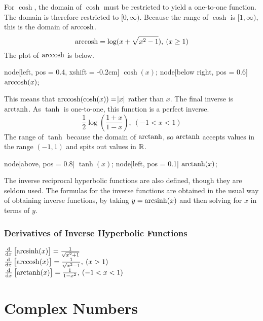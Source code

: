 \documentclass[12pt]{report}
\begin{document}
\begin{flushleft}
For \(\cosh\), the domain of \(\cosh\) must be restricted to yield a one-to-one
function. The domain is therefore restricted to \([0, \infty)\). Because the 
range of \(\cosh\) is \([1, \infty)\), this is the domain of \(\operatorname{arccosh}\).
\[\operatorname{arccosh} = \log(x + \sqrt{x^2 - 1}), \:(x \geq 1)\]
The plot of \(\operatorname{arccosh}\) is below.

\begin{plot}
    node[left, pos = 0.4, xshift = -0.2cm] {\(\cosh(x)\)};
    node[below right, pos = 0.6] {\(\operatorname{arccosh}(x)\)};
\end{plot}

This means that \(\operatorname{arccosh}(\cosh(x)) = \abs{x}\) rather than \(x\). The final
inverse is \(\operatorname{arctanh}\). As \(\tanh\) is one-to-one, this function is a perfect
inverse.
\[\frac{1}{2}\log\left(\frac{1 + x}{1 - x}\right), \:(-1 < x < 1)\]
The range of \(\tanh\) because the domain of \(\operatorname{arctanh}\), so \(\operatorname{arctanh}\)
accepts values in the range \((-1, 1)\) and spits out values in \(\mathbb{R}\).

\begin{plot}
    node[above, pos = 0.8] {\(\tanh(x)\)};
    node[left, pos = 0.1] {\(\operatorname{arctanh}(x)\)};
\end{plot}

The inverse reciprocal hyperbolic functions are also defined, though they are 
seldom used. The formulas for the inverse functions are obtained in the usual
way of obtaining inverse functions, by taking \(y = \operatorname{arcsinh}(x)\) and then 
solving for \(x\) in terms of \(y\).

\subsubsection*{Derivatives of Inverse Hyperbolic Functions}

\begin{formulalist}
    \(\frac{\mathrm{d}}{\mathrm{d}x}\left[\operatorname{arcsinh}(x)\right] = \frac{1}{\sqrt{x^2 + 1}}\) \\
    \(\frac{\mathrm{d}}{\mathrm{d}x}\left[\operatorname{arccosh}(x)\right] = \frac{1}{\sqrt{x^2 - 1}}, \:(x > 1)\) \\
    \(\frac{\mathrm{d}}{\mathrm{d}x}\left[\operatorname{arctanh}(x)\right] = \frac{1}{1 - x^2}, \:(-1 < x < 1)\) \\
\end{formulalist}

\section*{Complex Numbers}


\end{flushleft}
\end{document}
